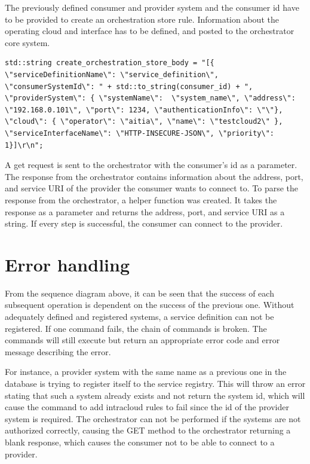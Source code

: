 The previously defined consumer and provider system and the consumer id have to be provided to create an orchestration store rule. 
Information about the operating cloud and interface has to be defined, and posted to the orchestrator core system.
\begin{lstlisting}[style=CStyle]
std::string create_orchestration_store_body = "[{ \"serviceDefinitionName\": \"service_definition\", \"consumerSystemId\": " + std::to_string(consumer_id) + ", \"providerSystem\": { \"systemName\":  \"system_name\", \"address\": \"192.168.0.101\", \"port\": 1234, \"authenticationInfo\": \"\"}, \"cloud\": { \"operator\": \"aitia\", \"name\": \"testcloud2\" }, \"serviceInterfaceName\": \"HTTP-INSECURE-JSON\", \"priority\": 1}]\r\n";
\end{lstlisting}
A get request is sent to the orchestrator with the consumer's id as a parameter.
The response from the orchestrator contains information about the address, port, and service URI of the provider the consumer wants to connect to.
To parse the response from the orchestrator, a helper function was created. It takes the response as a parameter and returns the address, port, and service URI as a string.
If every step is successful, the consumer can connect to the provider.

\section{Error handling}
From the sequence diagram above, it can be seen that the success of each subsequent operation is dependent on the success of the previous one.
Without adequately defined and registered systems, a service definition can not be registered. If one command fails, the chain of commands is broken.
The commands will still execute but return an appropriate error code and error message describing the error.

For instance, a provider system with the same name as a previous one in the database is trying to register itself to the service registry.
This will throw an error stating that such a system already exists and not return the system id, which will cause the command to add intracloud rules to fail since the id of the provider system is required. 
The orchestrator can not be performed if the systems are not authorized correctly, causing the GET method to the orchestrator returning a blank response, which causes the consumer not to be able to connect to a provider.
